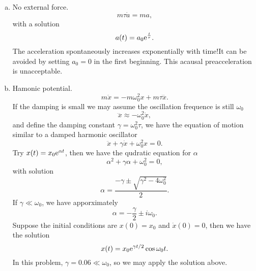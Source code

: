 \documentclass[10pt]{article}
\begin{document}
\begin{enumerate}[(a)]
	\item No external force. 
		\begin{equation}
			m \tau \dot{a} = ma,
		\end{equation}
		with a solution 
		\begin{equation}
			a(t) = a_0 {\mathrm{e}}^{\frac{t}{\tau}}.
		\end{equation}
		The acceleration spontaneously increases exponentially with time!It can be avoided by setting $a_0 = 0$ in the first beginning. This acausal preacceleration is unacceptable. 
	\item Hamonic potential. 
		\begin{equation}
			m \ddot{x} = -m \omega_0^2 x + m \tau \dddot{x}.
		\end{equation}
		If the damping is small we may assume the oscillation frequence is still $\omega_0$
		\begin{equation}
			\dddot{x} \approx - \omega_0^2 \dot{x},
		\end{equation}
		and define the damping constant $\gamma = \omega_0^2 \tau$, we have the equation of motion similar to a damped harmonic oscillator
		\begin{equation}
			\ddot{x} + \gamma \dot{x} + \omega_0^2 x = 0.
		\end{equation}
		Try $x(t) = x_0 {\mathrm{e}}^{\alpha t}$, then we have the qudratic equation for $\alpha$ 
		\begin{equation}
			\alpha^2 + \gamma \alpha + \omega_0^2 = 0,
		\end{equation}
		with solution 
		\begin{equation}
			\alpha = \frac{-\gamma \pm \sqrt{\gamma^2 - 4 \omega_0^2}}{2}.
		\end{equation}
		If $\gamma \ll \omega_0$, we have apporximately 
		\begin{equation}
			\alpha = -\frac{\gamma}{2} \pm i\omega_0.
		\end{equation}
		Suppose the initial conditions are $x(0) = x_0$ and $\dot{x}(0) = 0$, then we have the solution 
		\begin{equation}
			x(t) = x_0 {\mathrm{e}}^{\gamma t / 2} \cos{\omega_0 t}.
		\end{equation}
		In this problem, $\gamma = 0.06 \ll \omega_0$, so we may apply the solution above.
\end{enumerate}
\end{document}
